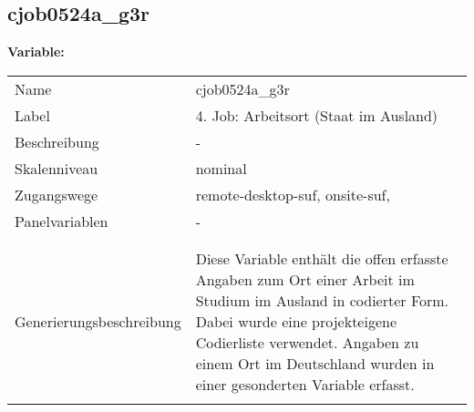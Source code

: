 	
	
	\subsection{cjob0524a\_g3r}
	\label{subSection:cjob0524a_g3r}

	\noindent\textbf{Variable:}\\
		\begin{tabular}{lL{11.3cm}}
			\label{tableVariable:cjob0524a_g3r}
			Name & cjob0524a\_g3r \\
			Label & 4. Job: Arbeitsort (Staat im Ausland) \\
			Beschreibung & - \\
			Skalenniveau & nominal \\
			Zugangswege &
				remote-desktop-suf,
				onsite-suf,
 \\
			Panelvariablen & -
			 \\
			 \\
 \\
					Generierungsbeschreibung & Diese Variable enthält die offen erfasste Angaben zum Ort einer Arbeit im Studium im Ausland in codierter Form. Dabei wurde eine projekteigene Codierliste verwendet. Angaben zu einem Ort im Deutschland wurden in einer gesonderten Variable erfasst. 
				 \\	
			 \\
		\end{tabular}






